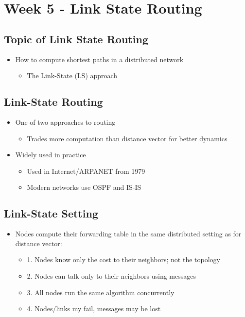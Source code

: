 \documentclass[12pt]{ctexart}   %
\begin{document}
\section{Week 5 - Link State Routing}	
	\subsection{Topic of Link State Routing}
	\begin{itemize}
		\item How to compute shortest paths in a distributed network
		\begin{itemize}
			\item The Link-State (LS) approach
		\end{itemize}
	\end{itemize}
	
	\subsection{Link-State Routing}
	\begin{itemize}
		\item One of two approaches to routing
		\begin{itemize}
			\item Trades more computation than distance vector for better dynamics
		\end{itemize}
		
		\item Widely used in practice
		\begin{itemize}
			\item Used in Internet/ARPANET from 1979
			\item Modern networks use OSPF and IS-IS
		\end{itemize}
	\end{itemize}
	
	\subsection{ Link-State Setting}
	\begin{itemize}
		\item Nodes compute their forwarding table in the same distributed setting as for distance vector:
		\begin{itemize}
			\item {\color{blue} 1.} Nodes know only the cost to their neighbors; not the topology
			\item {\color{blue} 2.} Nodes can talk only to their neighbors using messages
			\item {\color{blue} 3.} All nodes run the same algorithm concurrently
			\item {\color{blue} 4.} Nodes/links my fail, messages may be lost
		\end{itemize}
	\end{itemize}
	
\end{document}
